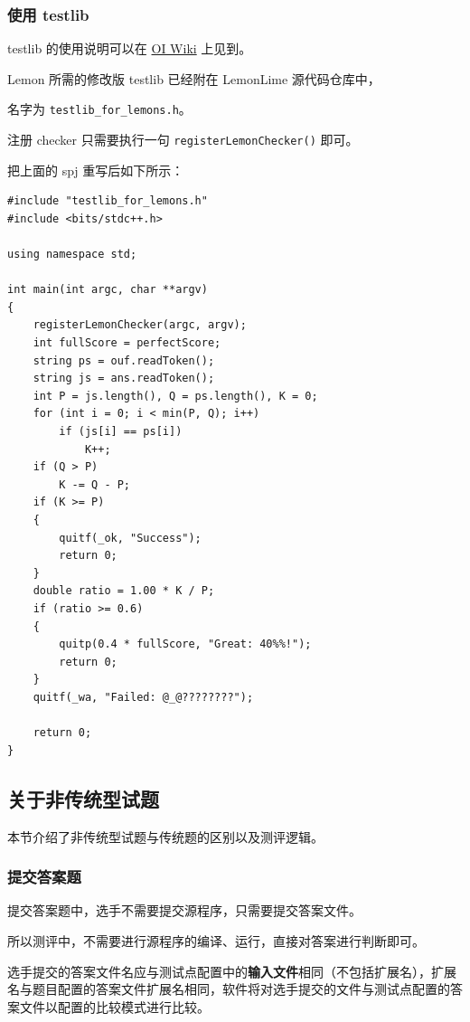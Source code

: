 \documentclass[UTF-8]{ctexart}
\begin{document}
			\subsubsection{使用 testlib}

				testlib 的使用说明可以在 \href{https://oi-wiki.org/intro/testlib/}{OI Wiki} 上见到。

				Lemon 所需的修改版 testlib 已经附在 LemonLime 源代码仓库中，

				名字为 \texttt{testlib\_for\_lemons.h}。

				注册 checker 只需要执行一句 \texttt{registerLemonChecker()} 即可。

				把上面的 spj 重写后如下所示：

				\begin{verbatim}
#include "testlib_for_lemons.h"
#include <bits/stdc++.h>

using namespace std;

int main(int argc, char **argv)
{
	registerLemonChecker(argc, argv);
	int fullScore = perfectScore;
	string ps = ouf.readToken();
	string js = ans.readToken();
	int P = js.length(), Q = ps.length(), K = 0;
	for (int i = 0; i < min(P, Q); i++)
		if (js[i] == ps[i])
			K++;
	if (Q > P)
		K -= Q - P;
	if (K >= P)
	{
		quitf(_ok, "Success");
		return 0;
	}
	double ratio = 1.00 * K / P;
	if (ratio >= 0.6)
	{
		quitp(0.4 * fullScore, "Great: 40%%!");
		return 0;
	}
	quitf(_wa, "Failed: @_@????????");

	return 0;
}
				\end{verbatim}


		\subsection{关于非传统型试题}

			本节介绍了非传统型试题与传统题的区别以及测评逻辑。

			\subsubsection{提交答案题}

				提交答案题中，选手不需要提交源程序，只需要提交答案文件。

				所以测评中，不需要进行源程序的编译、运行，直接对答案进行判断即可。

				选手提交的答案文件名应与测试点配置中的\textbf{输入文件}相同（不包括扩展名），扩展名与题目配置的答案文件扩展名相同，软件将对选手提交的文件与测试点配置的答案文件以配置的比较模式进行比较。
\end{document}
